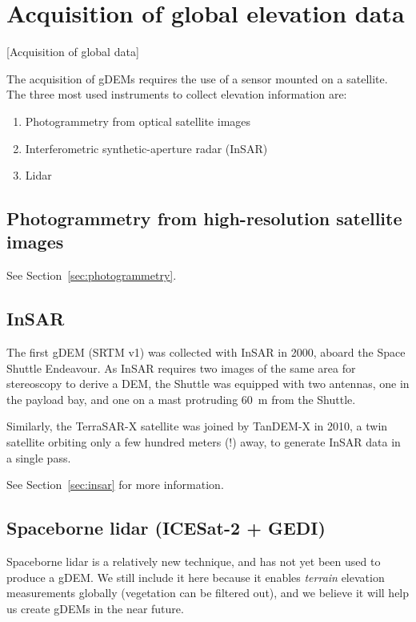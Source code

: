

%
\section{Acquisition of global elevation data}[Acquisition of global data]

The acquisition of gDEMs requires the use of a sensor mounted on a satellite.
The three most used instruments to collect elevation information are:
\begin{enumerate}
  \item Photogrammetry from optical satellite images
  \item Interferometric synthetic-aperture radar (InSAR)
  \item Lidar
\end{enumerate}


\subsection{Photogrammetry from high-resolution satellite images}

See Section~\ref{sec:photogrammetry}.


\subsection{InSAR}%

The first gDEM (SRTM v1) was collected with InSAR in 2000, aboard the Space Shuttle Endeavour.
As InSAR requires two images of the same area for stereoscopy to derive a DEM, the Shuttle was equipped with two antennas, one in the payload bay, and one on a mast protruding \qty{60}{m} from the Shuttle.

Similarly, the TerraSAR-X satellite was joined by TanDEM-X in 2010, a twin satellite orbiting only a few hundred meters (!) away, to generate InSAR data in a single pass.

See Section~\ref{sec:insar} for more information.


\subsection{Spaceborne lidar (ICESat-2 + GEDI)}%

Spaceborne lidar is a relatively new technique, and has not yet been used to produce a gDEM\@.
We still include it here because it enables \emph{terrain} elevation measurements globally (vegetation can be filtered out), and we believe it will help us create gDEMs in the near future.

